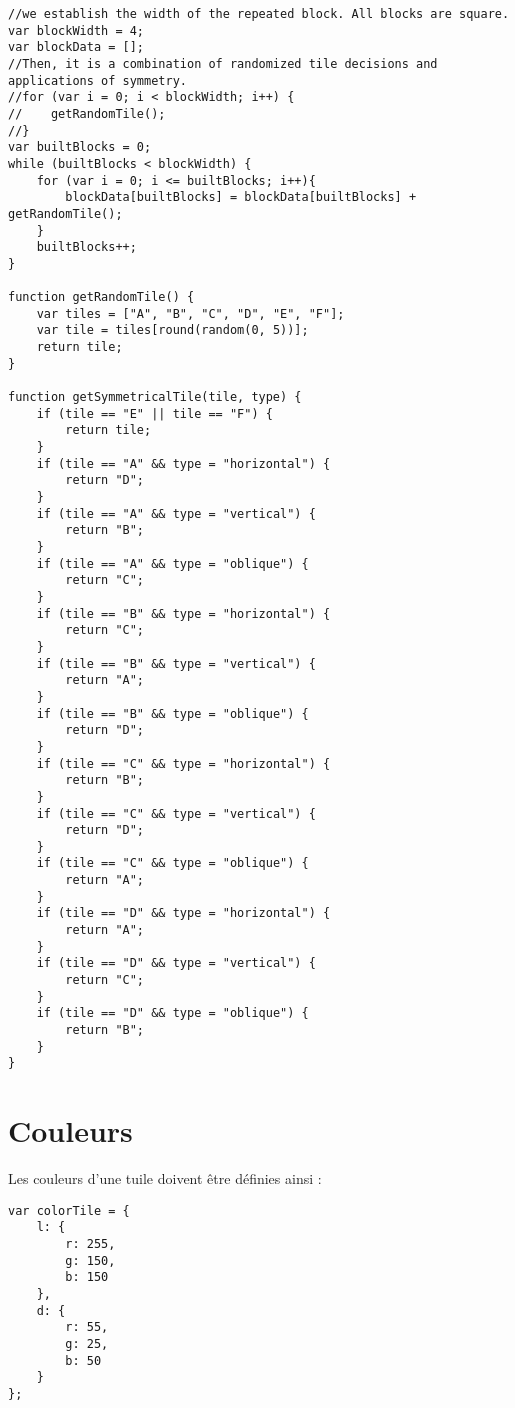 \begin{lstlisting}
//we establish the width of the repeated block. All blocks are square.
var blockWidth = 4;
var blockData = [];
//Then, it is a combination of randomized tile decisions and applications of symmetry.
//for (var i = 0; i < blockWidth; i++) {
//    getRandomTile();
//}
var builtBlocks = 0;
while (builtBlocks < blockWidth) {
    for (var i = 0; i <= builtBlocks; i++){
        blockData[builtBlocks] = blockData[builtBlocks] + getRandomTile();
    }
    builtBlocks++;
}

function getRandomTile() {
    var tiles = ["A", "B", "C", "D", "E", "F"];
    var tile = tiles[round(random(0, 5))];
    return tile;
}

function getSymmetricalTile(tile, type) {
    if (tile == "E" || tile == "F") {
        return tile;
    }
    if (tile == "A" && type = "horizontal") {
        return "D";
    }
    if (tile == "A" && type = "vertical") {
        return "B";
    }
    if (tile == "A" && type = "oblique") {
        return "C";
    }
    if (tile == "B" && type = "horizontal") {
        return "C";
    }
    if (tile == "B" && type = "vertical") {
        return "A";
    }
    if (tile == "B" && type = "oblique") {
        return "D";
    }
    if (tile == "C" && type = "horizontal") {
        return "B";
    }
    if (tile == "C" && type = "vertical") {
        return "D";
    }
    if (tile == "C" && type = "oblique") {
        return "A";
    }
    if (tile == "D" && type = "horizontal") {
        return "A";
    }
    if (tile == "D" && type = "vertical") {
        return "C";
    }
    if (tile == "D" && type = "oblique") {
        return "B";
    }
}

\end{lstlisting}

\section{Couleurs}

Les couleurs d'une tuile doivent être définies ainsi : 
\begin{lstlisting}
var colorTile = {
    l: {
        r: 255,
        g: 150,
        b: 150
    },
    d: {
        r: 55,
        g: 25,
        b: 50
    }
};
\end{lstlisting}